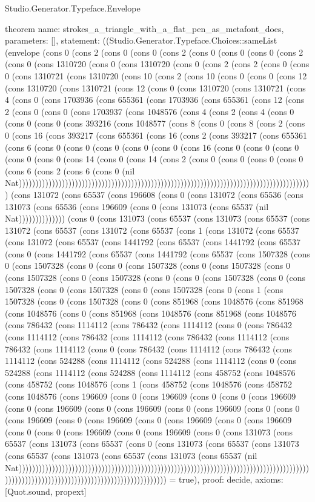 \begin{lexlean}{Studio.Generator.Typeface.Envelope}
\begin{semanticmodule}
theorem{
  name: strokes_a_triangle_with_a_flat_pen_as_metafont_does,
  parameters: [],
  statement: ((Studio.Generator.Typeface.Choices::sameList (envelope (cons 0 (cons 2 (cons 0 (cons 0 (cons 2 (cons 0 (cons 0 (cons 0 (cons 2 (cons 0 (cons 1310720 (cons 0 (cons 1310720 (cons 0 (cons 2 (cons 2 (cons 0 (cons 0 (cons 1310721 (cons 1310720 (cons 10 (cons 2 (cons 10 (cons 0 (cons 0 (cons 12 (cons 1310720 (cons 1310721 (cons 12 (cons 0 (cons 1310720 (cons 1310721 (cons 4 (cons 0 (cons 1703936 (cons 655361 (cons 1703936 (cons 655361 (cons 12 (cons 2 (cons 0 (cons 0 (cons 1703937 (cons 1048576 (cons 4 (cons 2 (cons 4 (cons 0 (cons 0 (cons 0 (cons 393216 (cons 1048577 (cons 8 (cons 0 (cons 8 (cons 2 (cons 0 (cons 16 (cons 393217 (cons 655361 (cons 16 (cons 2 (cons 393217 (cons 655361 (cons 6 (cons 0 (cons 0 (cons 0 (cons 0 (cons 0 (cons 16 (cons 0 (cons 0 (cons 0 (cons 0 (cons 0 (cons 14 (cons 0 (cons 14 (cons 2 (cons 0 (cons 0 (cons 0 (cons 0 (cons 6 (cons 2 (cons 6 (cons 0 (nil Nat))))))))))))))))))))))))))))))))))))))))))))))))))))))))))))))))))))))))))))))))))))))))) (cons 131072 (cons 65537 (cons 196608 (cons 0 (cons 131072 (cons 65536 (cons 131073 (cons 65536 (cons 196609 (cons 0 (cons 131073 (cons 65537 (nil Nat)))))))))))))) (cons 0 (cons 131073 (cons 65537 (cons 131073 (cons 65537 (cons 131072 (cons 65537 (cons 131072 (cons 65537 (cons 1 (cons 131072 (cons 65537 (cons 131072 (cons 65537 (cons 1441792 (cons 65537 (cons 1441792 (cons 65537 (cons 0 (cons 1441792 (cons 65537 (cons 1441792 (cons 65537 (cons 1507328 (cons 0 (cons 1507328 (cons 0 (cons 0 (cons 1507328 (cons 0 (cons 1507328 (cons 0 (cons 1507328 (cons 0 (cons 1507328 (cons 0 (cons 0 (cons 1507328 (cons 0 (cons 1507328 (cons 0 (cons 1507328 (cons 0 (cons 1507328 (cons 0 (cons 1 (cons 1507328 (cons 0 (cons 1507328 (cons 0 (cons 851968 (cons 1048576 (cons 851968 (cons 1048576 (cons 0 (cons 851968 (cons 1048576 (cons 851968 (cons 1048576 (cons 786432 (cons 1114112 (cons 786432 (cons 1114112 (cons 0 (cons 786432 (cons 1114112 (cons 786432 (cons 1114112 (cons 786432 (cons 1114112 (cons 786432 (cons 1114112 (cons 0 (cons 786432 (cons 1114112 (cons 786432 (cons 1114112 (cons 524288 (cons 1114112 (cons 524288 (cons 1114112 (cons 0 (cons 524288 (cons 1114112 (cons 524288 (cons 1114112 (cons 458752 (cons 1048576 (cons 458752 (cons 1048576 (cons 1 (cons 458752 (cons 1048576 (cons 458752 (cons 1048576 (cons 196609 (cons 0 (cons 196609 (cons 0 (cons 0 (cons 196609 (cons 0 (cons 196609 (cons 0 (cons 196609 (cons 0 (cons 196609 (cons 0 (cons 0 (cons 196609 (cons 0 (cons 196609 (cons 0 (cons 196609 (cons 0 (cons 196609 (cons 0 (cons 0 (cons 196609 (cons 0 (cons 196609 (cons 0 (cons 131073 (cons 65537 (cons 131073 (cons 65537 (cons 0 (cons 131073 (cons 65537 (cons 131073 (cons 65537 (cons 131073 (cons 65537 (cons 131073 (cons 65537 (nil Nat))))))))))))))))))))))))))))))))))))))))))))))))))))))))))))))))))))))))))))))))))))))))))))))))))))))))))))))))))))))))))))))))))))))))) = true),
  proof: decide{},
  axioms: [Quot.sound, propext]
}


\end{semanticmodule}
\end{lexlean}

